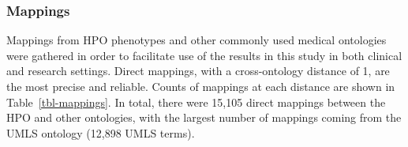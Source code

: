 \documentclass[
]{article}
\begin{document}
\newpage{}

\subsubsection{Mappings}\label{mappings}

\begin{table}

\caption{\label{tbl-mappings}Mappings between HPO phenotypes and other
medical ontologies. ``source'' indicates the medical ontology and
``distance'' indicates the cross-ontology distance. ``source terms'' and
``HPO terms'' indicates the number of unique IDs mapped from the source
ontology and HPO respectively. ``mappings'' is the total number of
cross-ontology mappings within a given distance. Some IDs may have more
than one mapping for a given source due to many-to-many relationships.}


\end{table}%

Mappings from HPO phenotypes and other commonly used medical ontologies
were gathered in order to facilitate use of the results in this study in
both clinical and research settings. Direct mappings, with a
cross-ontology distance of 1, are the most precise and reliable. Counts
of mappings at each distance are shown in Table~\ref{tbl-mappings}. In
total, there were 15,105 direct mappings between the HPO and other
ontologies, with the largest number of mappings coming from the UMLS
ontology (12,898 UMLS terms).
\end{document}
